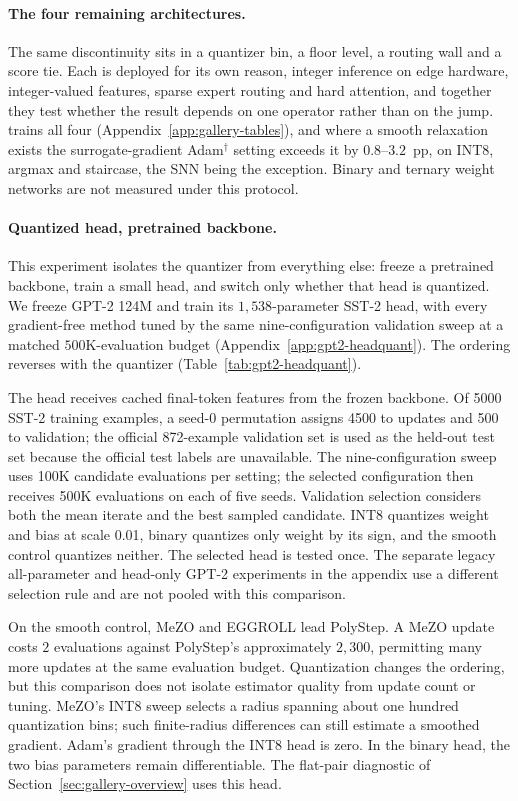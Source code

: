 \paragraph{The four remaining architectures.}
The same discontinuity sits in a quantizer bin, a floor level, a routing wall and a
score tie. Each is deployed for its own reason, integer inference on edge hardware,
integer-valued features, sparse expert routing and hard attention, and together they
test whether the result depends on one operator rather than on the jump.
\sysname{} trains all four (Appendix~\ref{app:gallery-tables}), and where a smooth
relaxation exists the surrogate-gradient Adam$^\dagger$ setting exceeds it by
$0.8$--$3.2$~pp, on INT8, argmax and staircase, the SNN being the exception. Binary and
ternary weight networks are not measured under this protocol.

\paragraph{Quantized head, pretrained backbone.}
This experiment isolates the quantizer from everything else: freeze a pretrained backbone,
train a small head, and switch only whether that head is quantized. We freeze GPT-2 124M
and train its $1{,}538$-parameter SST-2 head, with every gradient-free method tuned by
the same nine-configuration validation sweep at a matched $500$K-evaluation budget
(Appendix~\ref{app:gpt2-headquant}). The ordering reverses with the quantizer
(Table~\ref{tab:gpt2-headquant}).

The head receives cached final-token features from the frozen backbone.
Of 5000 SST-2 training examples, a seed-0 permutation assigns 4500 to
updates and 500 to validation; the official 872-example validation set is
used as the held-out test set because the official test labels are unavailable.
The nine-configuration sweep uses 100K candidate evaluations per setting;
the selected configuration then receives 500K evaluations on each of five
seeds. Validation selection considers both the mean iterate and the best
sampled candidate. INT8 quantizes weight and bias at scale 0.01, binary
quantizes only weight by its sign, and the smooth control quantizes neither.
The selected head is tested once. The separate legacy all-parameter and
head-only GPT-2 experiments in the appendix use a different selection rule
and are not pooled with this comparison.

On the smooth control, MeZO and EGGROLL lead PolyStep. A MeZO update costs
$2$ evaluations against PolyStep's approximately $2{,}300$, permitting many more
updates at the same evaluation budget. Quantization changes the ordering, but this
comparison does not isolate estimator quality from update count or tuning.
MeZO's INT8 sweep selects a radius spanning about one hundred quantization bins;
such finite-radius differences can still estimate a smoothed gradient.
Adam's gradient through the INT8 head is zero. In the binary head, the two bias
parameters remain differentiable. The flat-pair diagnostic of
Section~\ref{sec:gallery-overview} uses this head.

